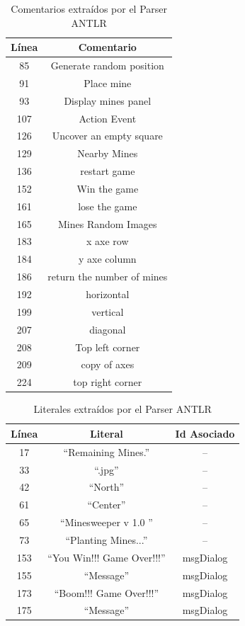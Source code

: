 \begin{table}[ht!]
{		\centering
   		\begin{tabular}{| c | c |}  
       \hline
\textbf{Línea} & \textbf{Comentario} \\ \hline
85&Generate random position \\ \hline
91&Place mine \\ \hline
93&Display mines panel \\ \hline
107&Action Event \\ \hline
126&Uncover an empty square \\ \hline
129&Nearby Mines \\ \hline
136&restart game \\ \hline
152&Win the game \\ \hline
161&lose the game \\ \hline
165&Mines Random Images \\ \hline
183&x axe row \\ \hline
184&y axe column \\ \hline
186&return the number of mines \\ \hline
192&horizontal \\ \hline
199&vertical \\ \hline
207&diagonal \\ \hline
208&Top left corner \\ \hline
209&copy of axes \\ \hline
224&top right corner \\ \hline
\end{tabular}
}
\caption{Comentarios extraídos por el Parser ANTLR}\label{tabla3}
\end{table}


\begin{table}[h!]
	
		\centering
   		\begin{tabular}{| c | c | c |}      
       \hline
  	   \textbf{Línea} & \textbf{Literal} & \textbf{Id Asociado} \\ \hline
17&“Remaining Mines.”&--  \\ \hline
33&“.jpg”&--  \\ \hline
42&“North”&--  \\ \hline
61&“Center”&--  \\ \hline
65&“Minesweeper v 1.0 ”&--  \\ \hline
73&“Planting Mines...”&--  \\ \hline
153&“You Win!!! Game Over!!!”&msgDialog\\ \hline
155&“Message”&msgDialog\\ \hline
173&“Boom!!! Game Over!!!”&msgDialog\\ \hline
175&“Message”&msgDialog\\ \hline
  \end{tabular} 
	 
   \caption{Literales extraídos por el Parser ANTLR}
   \label{tabla4}
     
\end{table} 


